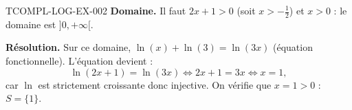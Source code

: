 \begin{corrige}{TCOMPL-LOG-EX-002}
\textbf{Domaine.} Il faut $2x+1>0$ (soit $x>-\frac{1}{2}$) et $x>0$ : le domaine est $]0,+\infty[$.

\textbf{Résolution.} Sur ce domaine, $\ln(x)+\ln(3) = \ln(3x)$ (équation fonctionnelle). L'équation devient :
\[
  \ln(2x+1) = \ln(3x) \iff 2x+1 = 3x \iff x = 1,
\]
car $\ln$ est strictement croissante donc injective. On vérifie que $x=1>0$ : $\boxed{S=\{1\}}$.
\end{corrige}
